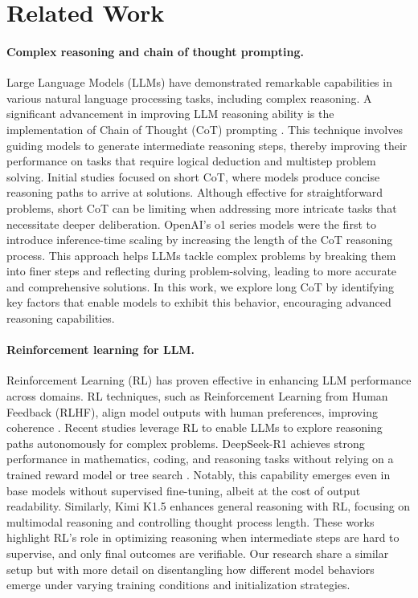 \section{Related Work}
\paragraph{Complex reasoning and chain of thought prompting.} Large Language Models (LLMs) have demonstrated remarkable capabilities in various natural language processing tasks, including complex reasoning. A significant advancement in improving LLM reasoning ability is the implementation of Chain of Thought (CoT) prompting \cite{wei2022cot}. This technique involves guiding models to generate intermediate reasoning steps, thereby improving their performance on tasks that require logical deduction and multistep problem solving. Initial studies \cite{lambert2024tulu, wei2022cot, flan, yu2024metamath} focused on short CoT, where models produce concise reasoning paths to arrive at solutions. Although effective for straightforward problems, short CoT can be limiting when addressing more intricate tasks that necessitate deeper deliberation. OpenAI’s o1 \cite{openai2024o1} series models were the first to introduce inference-time scaling by increasing the length of the CoT reasoning process. This approach helps LLMs tackle complex problems by breaking them into finer steps and reflecting during problem-solving, leading to more accurate and comprehensive solutions. In this work, we explore long CoT by identifying key factors that enable models to exhibit this behavior, encouraging advanced reasoning capabilities.

\paragraph{Reinforcement learning for LLM.} Reinforcement Learning (RL) has proven effective in enhancing LLM performance across domains. RL techniques, such as Reinforcement Learning from Human Feedback (RLHF), align model outputs with human preferences, improving coherence \cite{ouyang2022training}. Recent studies \cite{kimi2025k15, deepseekai2025r1, lambert2024tulu} leverage RL to enable LLMs to explore reasoning paths autonomously for complex problems. DeepSeek-R1 \cite{deepseekai2025r1} achieves strong performance in mathematics, coding, and reasoning tasks without relying on a trained reward model \cite{lightman2023verifystep, wang2024multistep} or tree search \cite{feng2023alphazerolike, snell2024scaling}. Notably, this capability emerges even in base models without supervised fine-tuning, albeit at the cost of output readability. Similarly, Kimi K1.5 \cite{kimi2025k15} enhances general reasoning with RL, focusing on multimodal reasoning and controlling thought process length. These works highlight RL’s role in optimizing reasoning when intermediate steps are hard to supervise, and only final outcomes are verifiable. Our research share a similar setup but with more detail on disentangling how different model behaviors emerge under varying training conditions and initialization strategies.
